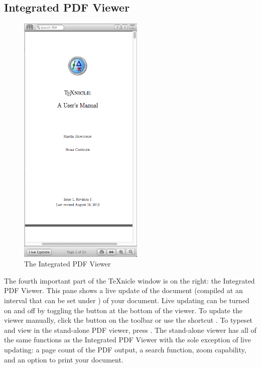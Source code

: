 \subsection{Integrated PDF Viewer}
\label{userguide.quickstart.pdfviewer}
\begin{figure}
\centering
\includegraphics[width=0.53\textwidth]{TeXnicle-Images/texnicle-integratedpdf.png}
\caption{The Integrated PDF Viewer}
\label{fig:texnicle-integratedpdf}
\end{figure}
The fourth important part of the TeXnicle window is on the right: the Integrated PDF Viewer. This pane shows a live update of the document (compiled at an interval that can be set under ) of your document. Live updating can be turned on and off by toggling the  button at the bottom of the viewer. To update the viewer manually, click the  button on the toolbar or use the shortcut . To typeset and view in the stand-alone PDF viewer, press . The stand-alone viewer has all of the same functions as the Integrated PDF Viewer with the sole exception of live updating: a page count of the PDF output, a search function, zoom capability, and an option to print your document.

